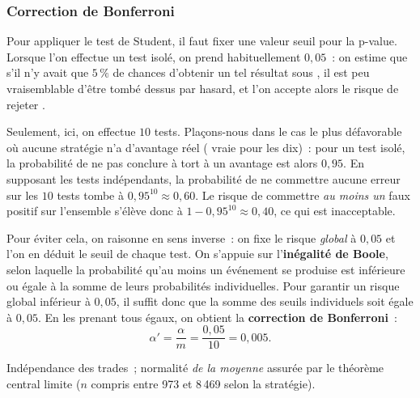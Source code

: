 \subsubsection*{Correction de Bonferroni} %
Pour appliquer le test de Student, il faut fixer une valeur seuil pour la
p-value. Lorsque l'on effectue un test isolé, on prend habituellement
\(0{,}05\)~: on estime que s'il n'y avait que \(5\,\%\) de chances
d'obtenir un tel résultat sous \Hzero{}, il est peu vraisemblable d'être
tombé dessus par hasard, et l'on accepte alors le risque de rejeter
\Hzero{}.

Seulement, ici, on effectue \(10\) tests. Plaçons-nous dans le cas le plus
défavorable où aucune stratégie n'a d'avantage réel (\Hzero{} vraie pour
les dix)~: pour un test isolé, la probabilité de ne pas conclure à tort à
un avantage est alors \(0{,}95\). En supposant les tests indépendants, la
probabilité de ne commettre aucune erreur sur les \(10\) tests tombe à
\(0{,}95^{10} \approx 0{,}60\). Le risque de commettre \emph{au moins un}
faux positif sur l'ensemble s'élève donc à
\(1 - 0{,}95^{10} \approx 0{,}40\), ce qui est inacceptable.

Pour éviter cela, on raisonne en sens inverse~: on fixe le risque
\emph{global} à \(0{,}05\) et l'on en déduit le seuil de chaque test.
On s'appuie sur l'\textbf{inégalité de Boole}, selon laquelle la
probabilité qu'au moins un événement se produise est inférieure ou égale
à la somme de leurs probabilités individuelles. Pour garantir un risque
global inférieur à \(0{,}05\), il suffit donc que la somme des seuils
individuels soit égale à \(0{,}05\). En les prenant tous égaux, on obtient
la \textbf{correction de Bonferroni}~:
\[
  \alpha' = \frac{\alpha}{m} = \frac{0{,}05}{10} = 0{,}005 .
\]

\begin{conditions}
Indépendance des trades~; normalité \emph{de la moyenne} assurée par le
théorème central limite ($n$ compris entre 973 et 8\,469 selon la
stratégie).
\end{conditions}

